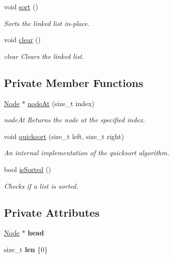 \begin{DoxyCompactItemize}
void \hyperlink{classLinkedList_a691b27f81c60be3c891fe6d56a4718b4}{sort} ()
\begin{DoxyCompactList}\small\item\em Sorts the linked list in-\/place. \end{DoxyCompactList}\item 
\mbox{\label{classLinkedList_a50c26292740c964ac7bef0e072868be1}} 
void \hyperlink{classLinkedList_a50c26292740c964ac7bef0e072868be1}{clear} ()
\begin{DoxyCompactList}\small\item\em clear Clears the linked list. \end{DoxyCompactList}\end{DoxyCompactItemize}
\subsection*{Private Member Functions}
\begin{DoxyCompactItemize}
\item 
\hyperlink{structLinkedList_1_1Node}{Node} $\ast$ \hyperlink{classLinkedList_ae19ff3c4e501a9638fa5caf5cc9d5b05}{node\+At} (size\+\_\+t index)
\begin{DoxyCompactList}\small\item\em node\+At Returns the node at the specified index. \end{DoxyCompactList}\item 
void \hyperlink{classLinkedList_a38612b71d816fec54ea379d0b8daec76}{quicksort} (size\+\_\+t left, size\+\_\+t right)
\begin{DoxyCompactList}\small\item\em An internal implementation of the quicksort algorithm. \end{DoxyCompactList}\item 
bool \hyperlink{classLinkedList_ae7e96c18033f13a7ddb22a4b5ba4cc7e}{is\+Sorted} ()
\begin{DoxyCompactList}\small\item\em Checks if a list is sorted. \end{DoxyCompactList}\end{DoxyCompactItemize}
\subsection*{Private Attributes}
\begin{DoxyCompactItemize}
\item 
\mbox{\label{classLinkedList_a2d1f848e19caa3f180b7fa6938125bba}} 
\hyperlink{structLinkedList_1_1Node}{Node} $\ast$ {\bfseries head}
\item 
\mbox{\label{classLinkedList_a61a7fe2947bd2d1dbf09a9a97bf7b3ce}} 
size\+\_\+t {\bfseries len} \{0\}
\end{DoxyCompactItemize}


